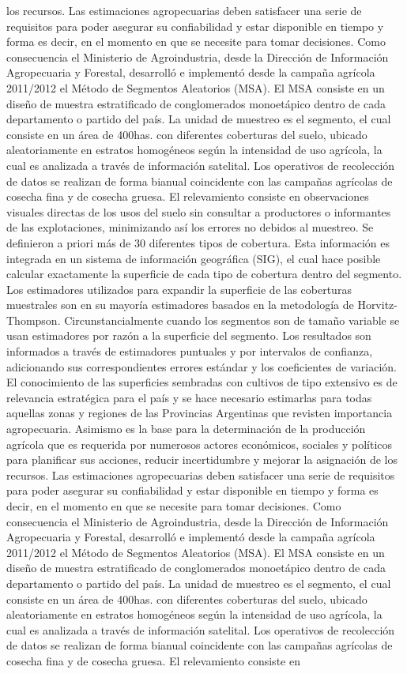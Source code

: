 los recursos. Las estimaciones agropecuarias deben satisfacer una serie de requisitos para poder asegurar su confiabilidad y estar disponible en tiempo y forma es decir, en el momento en que se necesite para tomar decisiones. Como consecuencia el Ministerio de Agroindustria, desde la Dirección de Información Agropecuaria y Forestal, desarrolló e implementó desde la campaña agrícola 2011/2012 el Método de Segmentos Aleatorios (MSA). El MSA consiste en un diseño de muestra estratificado de conglomerados monoetápico dentro de cada departamento o partido del país. La unidad de muestreo es el segmento, el cual consiste en un área de 400has. con diferentes coberturas del suelo, ubicado aleatoriamente en estratos homogéneos según la intensidad de uso agrícola, la cual es analizada a través de información satelital. Los operativos de recolección de datos se realizan de forma bianual coincidente con las campañas agrícolas de cosecha fina y de cosecha gruesa. El relevamiento consiste en observaciones visuales directas de los usos del suelo sin consultar a productores o informantes de las explotaciones, minimizando así los errores no debidos al muestreo. Se definieron a priori más de 30 diferentes tipos de cobertura. Esta información es integrada en un sistema de información geográfica (SIG), el cual hace posible calcular exactamente la superficie de cada tipo de cobertura dentro del segmento. Los estimadores utilizados para expandir la superficie de las coberturas muestrales son en su mayoría estimadores basados en la metodología de Horvitz-Thompson. Circunstancialmente cuando los segmentos son de tamaño variable se usan estimadores por razón a la superficie del segmento. Los resultados son informados a través de estimadores puntuales y por intervalos de confianza, adicionando sus correspondientes errores estándar y los coeficientes de variación. El conocimiento de las superficies sembradas con cultivos de tipo extensivo es de relevancia estratégica para el país y se hace necesario estimarlas para todas aquellas zonas y regiones de las Provincias Argentinas que revisten importancia agropecuaria. Asimismo es la base para la determinación de la producción agrícola que es requerida por numerosos actores económicos, sociales y políticos para planificar sus acciones, reducir incertidumbre y mejorar la asignación de los recursos. Las estimaciones agropecuarias deben satisfacer una serie de requisitos para poder asegurar su confiabilidad y estar disponible en tiempo y forma es decir, en el momento en que se necesite para tomar decisiones. Como consecuencia el Ministerio de Agroindustria, desde la Dirección de Información Agropecuaria y Forestal, desarrolló e implementó desde la campaña agrícola 2011/2012 el Método de Segmentos Aleatorios (MSA). El MSA consiste en un diseño de muestra estratificado de conglomerados monoetápico dentro de cada departamento o partido del país. La unidad de muestreo es el segmento, el cual consiste en un área de 400has. con diferentes coberturas del suelo, ubicado aleatoriamente en estratos homogéneos según la intensidad de uso agrícola, la cual es analizada a través de información satelital. Los operativos de recolección de datos se realizan de forma bianual coincidente con las campañas agrícolas de cosecha fina y de cosecha gruesa. El relevamiento consiste en 